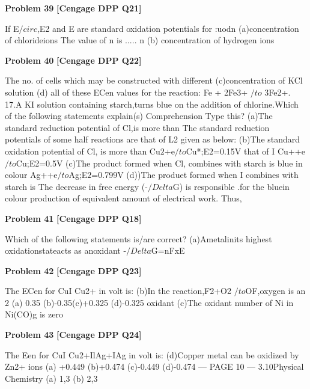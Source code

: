 \begin{problembox}
\textbf{Problem 39} \hfill \textbf{[Cengage DPP Q21]}
\label{q:ext-cng_dpp_all_questions-39}

If E$/circ$,E2 and E are standard oxidation potentials for
:uodn
(a)concentration of chlorideions
The value of n is .....
n
(b) concentration of hydrogen ions
\end{problembox}

\begin{problembox}
\textbf{Problem 40} \hfill \textbf{[Cengage DPP Q22]}
\label{q:ext-cng_dpp_all_questions-40}

The no. of cells which may be constructed with different
(c)concentration of KCl solution
(d) all of these
ECen values for the reaction: Fe + 2Fe3+ $/to$ 3Fe2+.
17.A KI solution containing starch,turns blue on the addition
of chlorine.Which of the following statements explain(s)
Comprehension Type
this?
(a)The standard reduction potential of Cl,is more than
The standard reduction potentials of some half reactions are
that of L2
given as below:
(b)The standard oxidation potential of Cl, is more than
Cu$2$+e$/to$Cu*;E$2$=0.15V
that of I
Cu++e$/to$Cu;E2=0.5V
(c)The product formed when Cl, combines with starch
is blue in colour
Ag++e$/to$Ag;E$2$=0.799V
(d))The produet formed when I combines with starch is
The decrease in free energy (-$/Delta$G) is responsible .for the
bluein colour
production of equivalent amount of electrical work. Thus,
\end{problembox}

\begin{problembox}
\textbf{Problem 41} \hfill \textbf{[Cengage DPP Q18]}
\label{q:ext-cng_dpp_all_questions-41}

Which of the following statements is/are correct?
(a)Ametalinits highest oxidationstateacts as anoxidant
-$/Delta$G=nFxE
\end{problembox}

\begin{problembox}
\textbf{Problem 42} \hfill \textbf{[Cengage DPP Q23]}
\label{q:ext-cng_dpp_all_questions-42}

The ECen for CuI Cu2+ in volt is:
(b)In the reaction,F2+O2
$/to$OF,oxygen is an
2
(a) 0.35
(b)-0.35(c)+0.325 (d)-0.325
oxidant
(c)The oxidant number of Ni in Ni(CO)g is zero
\end{problembox}

\begin{problembox}
\textbf{Problem 43} \hfill \textbf{[Cengage DPP Q24]}
\label{q:ext-cng_dpp_all_questions-43}

The Een for CuI Cu2+IlAg+IAg in volt is:
(d)Copper metal can be oxidized by Zn2+ ions
(a) +0.449
(b)+0.474
(c)-0.449
(d)-0.474
--- PAGE 10 ---
3.10Physical Chemistry
(a) 1,3
(b) 2,3
\end{problembox}

